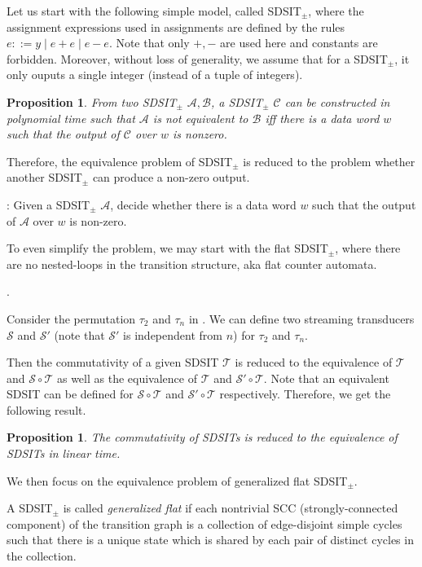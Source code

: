 \documentclass[11pt]{article}
\newtheorem{proposition}[theorem]{Proposition}
\def\Aa{{\mathscr{A} }}
\def\Bb{{\mathscr{B} }}
\def\Cc{{\mathscr{C} }}
\def\Ss{{\mathcal{S} }}
\def\Tt{{\mathcal{T} }}
\begin{document}
Let us start with the following simple model, called SDSIT$_{\pm}$, where the assignment expressions used in assignments are defined by the rules $e::= y \mid e+e \mid e - e$. Note that only $+,-$ are used here and constants are forbidden. Moreover, without loss of generality, we assume that for a SDSIT$_{\pm}$, it only ouputs a single integer (instead of a tuple of integers).

\begin{proposition}
From two SDSIT$_{\pm}$ $\Aa,\Bb$, a SDSIT$_{\pm}$ $\Cc$ can be constructed in polynomial time such that $\Aa$ is not equivalent to $\Bb$ iff there is a data word $w$ such that the output of $\Cc$ over $w$ is nonzero. 
\end{proposition}

Therefore, the equivalence problem of SDSIT$_{\pm}$ is reduced to the problem whether another SDSIT$_{\pm}$ can produce a non-zero output.

\medskip

: Given a SDSIT$_{\pm}$ $\Aa$, decide whether there is a data word $w$ such that the output of $\Aa$ over $w$ is non-zero. 


To even simplify the problem, we may start with the flat SDSIT$_{\pm}$, where there are no nested-loops in the transition structure, aka flat counter automata.

.

Consider the permutation $\tau_2$ and $\tau_n$ in \cite{CHSW15}. We can define two streaming transducers $\Ss$ and $\Ss'$ (note that $\Ss'$ is independent from $n$)  for $\tau_2$ and $\tau_n$.

Then the commutativity of a given SDSIT $\Tt$ is reduced to the equivalence of $\Tt$ and $\Ss \circ \Tt$ as well as the equivalence of $\Tt$ and $\Ss'\circ \Tt$. Note that an equivalent SDSIT can be defined for $\Ss \circ \Tt$ and $\Ss' \circ \Tt$ respectively. Therefore, we get the following result.

\begin{proposition}
The commutativity of SDSITs is reduced to the equivalence of SDSITs in linear time.
\end{proposition}

We then focus on the equivalence problem of generalized flat SDSIT$_{\pm}$.

A SDSIT$_{\pm}$ is called \emph{generalized flat} if each nontrivial SCC (strongly-connected component) of the transition graph is a collection of edge-disjoint simple cycles such that there is a unique state which is shared by each pair of distinct cycles in the collection.
\end{document}
